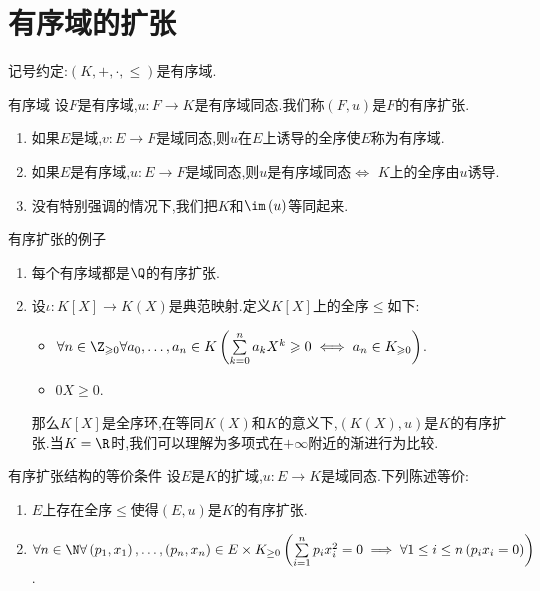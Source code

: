 \section{有序域的扩张}

记号约定:$\left(K,+,\cdot,\leq\right)$是有序域.

\begin{definition}{有序域}{}
	设$F$是有序域,$u:F\to K$是有序域同态.我们称$\left(F,u\right)$是$F$的有序扩张.
\end{definition}

\begin{remark}{}{}
	\begin{enumerate}
		\item 如果$E$是域,$v:E\to F$是域同态,则$u$在$E$上诱导的全序使$E$称为有序域.
		\item 如果$E$是有序域,$u:E\to F$是域同态,则$u$是有序域同态$\iff$ $K$上的全序由$u$诱导.
		\item 没有特别强调的情况下,我们把$K$和$\im\left(u\right)$等同起来.
	\end{enumerate}
\end{remark}

\begin{example}{有序扩张的例子}{}
	\begin{enumerate}
		\item 每个有序域都是$\Q$的有序扩张.
		\item 设$\iota:K[X]\to K(X)$是典范映射.定义$K\left[X\right]$上的全序$\leqslant$如下:
		\begin{itemize}
			\item $\forall n\in\Z_{\geqslant 0}\forall a_{0},\ldots,a_{n}\in K\left(\sum\limits_{k=0}^{n}a_{k}X^{k}\geqslant 0\iff a_{n}\in K_{\geqslant 0}\right)$.
			\item $0X\geqslant 0$.
		\end{itemize}
		那么$K\left[X\right]$是全序环,在等同$K(X)$和$K$的意义下,$\left(K(X),u\right)$是$K$的有序扩张.当$K=\R$时,我们可以理解为多项式在$+\infty$附近的渐进行为比较.
	\end{enumerate}
\end{example}

\begin{theorem}{有序扩张结构的等价条件}{}
	设$E$是$K$的扩域,$u:E\to K$是域同态.下列陈述等价:
	\begin{enumerate}
		\item $E$上存在全序$\leq$使得$\left(E,u\right)$是$K$的有序扩张.
		\item $\forall n\in\N\forall\left(p_{1},x_{1}\right),\ldots,\left(p_{n},x_{n}\right)\in E\times K_{\geq 0}\left(\sum\limits_{i=1}^{n}p_{i}x_{i}^{2}=0\implies\forall 1\leq i\leq n\left(p_{i}x_{i}=0\right)\right)$.
	\end{enumerate}
\end{theorem}

